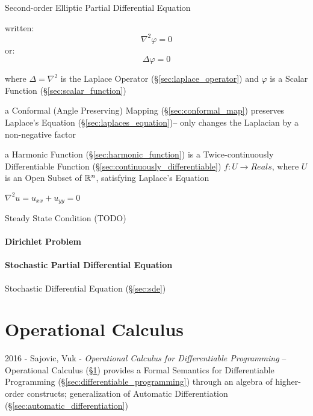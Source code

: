 Second-order Elliptic Partial Differential Equation

written:
\[ \nabla^2 \varphi = 0 \]
or:
\[ \Delta \varphi = 0 \]

where $\Delta = \nabla^2$ is the Laplace Operator
(\S\ref{sec:laplace_operator}) and $\varphi$ is a Scalar Function
(\S\ref{sec:scalar_function})

a Conformal (Angle Preserving) Mapping (\S\ref{sec:conformal_map}) preserves
Laplace's Equation (\S\ref{sec:laplaces_equation})-- only changes the Laplacian
by a non-negative factor

a Harmonic Function (\S\ref{sec:harmonic_function}) is a Twice-continuously
Differentiable Function (\S\ref{sec:continuously_differentiable}) $f : U
\rightarrow Reals$, where $U$ is an Open Subset of $\mathbb{R}^n$, satisfying
Laplace's Equation

$\nabla^2 u = u_{xx} + u_{yy} = 0$ %

Steady State Condition (TODO)



\paragraph{Dirichlet Problem}\label{sec:dirichlet_problem}\hfill

\paragraph{Stochastic Partial Differential Equation}\label{sec:spde}\hfill

\fist Stochastic Differential Equation (\S\ref{sec:sde})



\section{Operational Calculus}\label{sec:operational_calculus}

2016 - Sajovic, Vuk - \emph{Operational Calculus for Differentiable Programming}
-- Operational Calculus (\S\ref{sec:operational_calculus}) provides a Formal
Semantics for Differentiable Programming
(\S\ref{sec:differentiable_programming}) through an algebra of higher-order
constructs; generalization of Automatic Differentiation
(\S\ref{sec:automatic_differentiation})




